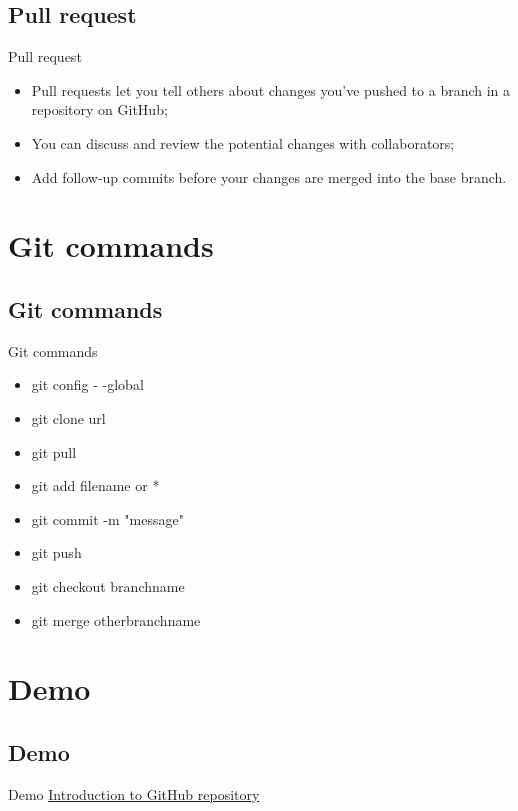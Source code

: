 \subsection {Pull request}
\begin{frame}{Pull request}
    \begin{itemize}
        \item Pull requests let you tell others about changes you've pushed to a branch in a repository on GitHub;
        \item You can discuss and review the potential changes with collaborators;
        \item Add follow-up commits before your changes are merged into the base branch.
    \end{itemize}
\end{frame}


\section{Git commands}
\subsection{Git commands}
\begin{frame}{Git commands}
    \begin{itemize}
        \item git config - -global
        \item git clone url
        \item git pull
        \item git add filename or *
        \item git commit -m "message"
        \item git push
        \item git checkout branchname
        \item git merge otherbranchname
    \end{itemize}
\end{frame}

\section{Demo}
\subsection{Demo}
\begin{frame}{Demo}
    \centering
    \href{https://github.com/taborda11/IntroductionGithub}{Introduction to GitHub repository}
    
\end{frame}

